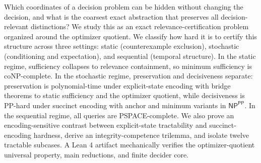 Which coordinates of a decision problem can be hidden without changing the decision, and what is the coarsest exact abstraction that preserves all decision-relevant distinctions? We study this as an exact relevance-certification problem organized around the optimizer quotient. We classify how hard it is to certify this structure across three settings: static (counterexample exclusion), stochastic (conditioning and expectation), and sequential (temporal structure). In the static regime, sufficiency collapses to relevance containment, so minimum sufficiency is coNP-complete. In the stochastic regime, preservation and decisiveness separate: preservation is polynomial-time under explicit-state encoding with bridge theorems to static sufficiency and the optimizer quotient, while decisiveness is PP-hard under succinct encoding with anchor and minimum variants in $\textsf{NP}^{\textsf{PP}}$. In the sequential regime, all queries are PSPACE-complete. We also prove an encoding-sensitive contrast between explicit-state tractability and succinct-encoding hardness, derive an integrity-competence trilemma, and isolate twelve tractable subcases. A Lean 4 artifact mechanically verifies the optimizer-quotient universal property, main reductions, and finite decider core.
